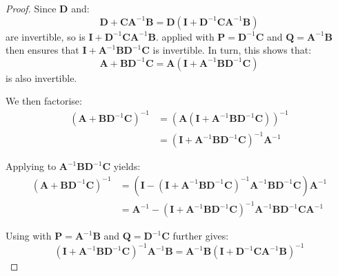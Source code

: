 \begin{proof}
	Since $\mathbf{D}$ and:
	\begin{equation}
		\mathbf{D}+\mathbf{C}\mathbf{A}^{-1}\mathbf{B}=\mathbf{D}\left(\mathbf{I}+\mathbf{D}^{-1}\mathbf{C}\mathbf{A}^{-1}\mathbf{B}\right)
	\end{equation}
	are invertible, so is $\mathbf{I}+\mathbf{D}^{-1}\mathbf{C}\mathbf{A}^{-1}\mathbf{B}$.  applied with $\mathbf{P}=\mathbf{D}^{-1}\mathbf{C}$ and $\mathbf{Q}=\mathbf{A}^{-1}\mathbf{B}$ then ensures that $\mathbf{I}+\mathbf{A}^{-1}\mathbf{B}\mathbf{D}^{-1}\mathbf{C}$ is invertible. In turn, this shows that:
	\begin{equation}
		\mathbf{A}+\mathbf{B}\mathbf{D}^{-1}\mathbf{C}=\mathbf{A}\left(\mathbf{I}+\mathbf{A}^{-1}\mathbf{B}\mathbf{D}^{-1}\mathbf{C}\right)
	\end{equation}
	is also invertible.

	We then factorise:
	\begin{equation}
		\begin{aligned}
		\left(\mathbf{A}+\mathbf{B}\mathbf{D}^{-1}\mathbf{C}\right)^{-1}&=\left(\mathbf{A}(\mathbf{I}+\mathbf{A}^{-1}\mathbf{B}\mathbf{D}^{-1}\mathbf{C})\right)^{-1}\\
		&=\left(\mathbf{I}+\mathbf{A}^{-1}\mathbf{B}\mathbf{D}^{-1}\mathbf{C}\right)^{-1}\mathbf{A}^{-1}
		\end{aligned}
	\end{equation}

	Applying  to $\mathbf{A}^{-1}\mathbf{B}\mathbf{D}^{-1}\mathbf{C}$ yields:
	\begin{equation}
		\begin{aligned}
		\left(\mathbf{A}+\mathbf{B}\mathbf{D}^{-1}\mathbf{C}\right)^{-1}&=\left(\mathbf{I}-\left(\mathbf{I}+\mathbf{A}^{-1}\mathbf{B}\mathbf{D}^{-1}\mathbf{C}\right)^{-1}\mathbf{A}^{-1}\mathbf{B}\mathbf{D}^{-1}\mathbf{C}\right)\mathbf{A}^{-1}\\
		&=\mathbf{A}^{-1}-\left(\mathbf{I}+\mathbf{A}^{-1}\mathbf{B}\mathbf{D}^{-1}\mathbf{C}\right)^{-1}\mathbf{A}^{-1}\mathbf{B}\mathbf{D}^{-1}\mathbf{C}\mathbf{A}^{-1}
		\end{aligned}
	\end{equation}

	Using  with $\mathbf{P}=\mathbf{A}^{-1}\mathbf{B}$ and $\mathbf{Q}=\mathbf{D}^{-1}\mathbf{C}$ further gives:
	\begin{equation}
		\left(\mathbf{I}+\mathbf{A}^{-1}\mathbf{B}\mathbf{D}^{-1}\mathbf{C}\right)^{-1}\mathbf{A}^{-1}\mathbf{B}=\mathbf{A}^{-1}\mathbf{B}\left(\mathbf{I}+\mathbf{D}^{-1}\mathbf{C}\mathbf{A}^{-1}\mathbf{B}\right)^{-1}
	\end{equation}


\end{proof}
